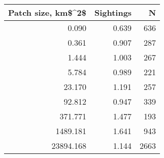 \begin{tabular}{rrr}
\toprule
 Patch size, km\$\textasciicircum 2\$ &  Sightings &    N \\
\midrule
              0.090 &      0.639 &  636 \\
              0.361 &      0.907 &  287 \\
              1.444 &      1.003 &  267 \\
              5.784 &      0.989 &  221 \\
             23.170 &      1.191 &  257 \\
             92.812 &      0.947 &  339 \\
            371.771 &      1.477 &  193 \\
           1489.181 &      1.641 &  943 \\
          23894.168 &      1.144 & 2663 \\
\bottomrule
\end{tabular}
